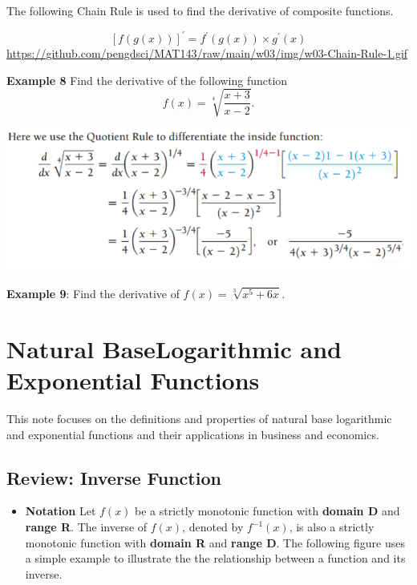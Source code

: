 \documentclass[
]{book}
\providecommand{\tightlist}{%
  \setlength{\itemsep}{0pt}\setlength{\parskip}{0pt}}
\begin{document}
The following Chain Rule is used to find the derivative of composite functions.

\[
[f(g(x))]^\prime = f^\prime(g(x)) \times g^\prime(x)
\]
\url{https://github.com/pengdsci/MAT143/raw/main/w03/img/w03-Chain-Rule-1.gif}

\textbf{Example 8} Find the derivative of the following function
\[
f(x) = \sqrt[4]{\frac{x + 3}{x - 2}}.
\]

\begin{flushleft}\includegraphics[width=0.7\linewidth]{img03/w03-ChainRuleEx01} \end{flushleft}

\textbf{Example 9}: Find the derivative of \(f(x) = \sqrt[3]{x^5 + 6x}\).

\hypertarget{natural-baselogarithmic-and-exponential-functions}{%
\chapter{Natural BaseLogarithmic and Exponential Functions}\label{natural-baselogarithmic-and-exponential-functions}}

This note focuses on the definitions and properties of natural base logarithmic and exponential functions and their applications in business and economics.

\hypertarget{review-inverse-function}{%
\section{Review: Inverse Function}\label{review-inverse-function}}

\begin{itemize}
\tightlist
\item
  \textbf{Notation} Let \(f(x)\) be a strictly monotonic function with \textbf{\color{red}domain D} and \textbf{range R}. The inverse of \(f(x)\), denoted by \(f^{-1}(x)\), is also a strictly monotonic function with \textbf{\color{red}domain R} and \textbf{range D}. The following figure uses a simple example to illustrate the the relationship between a function and its inverse.
\end{itemize}
\end{document}
